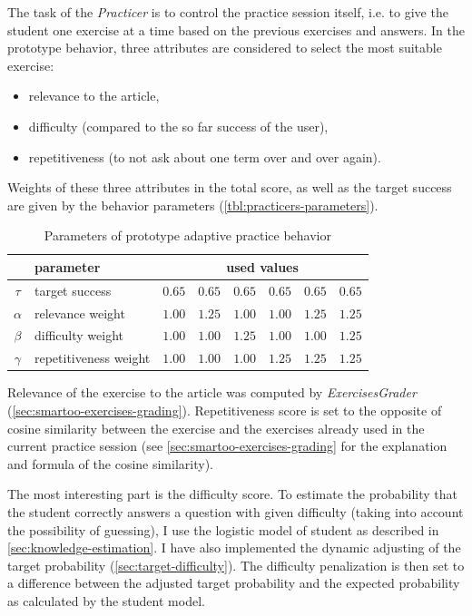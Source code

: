 \documentclass[12pt, twoside]{fithesis2}
\renewcommand{\_}{\leavevmode \kern0.07em\vbox{\hrule width0.4em}}
\newcommand{\squarebullet}{\textcolor{black}{\raisebox{0.15em}{\rule{4pt}{4pt}}}}
\newcommand{\emptysquarebullet}{\textcolor{black}{\raisebox{0.10em}{\tiny$\square$}}}
\newenvironment{myItemize}{
  \begin{itemize}[leftmargin=2em,rightmargin=1em,itemsep=\parskip ,parsep=0em,topsep=0em,partopsep=0em]
  \renewcommand{\labelitemi}{\squarebullet}
  \renewcommand{\labelitemii}{\textbullet}
}{
  \end{itemize}
}
\begin{document}
The task of the \textit{Practicer} is to control the practice session itself, i.e. to give the student one exercise at a time based on the previous exercises and answers.
In the prototype behavior, three attributes are considered to select the most suitable exercise:
\begin{myItemize}
  \item relevance to the article,
  \item difficulty (compared to the so far success of the user),
  \item repetitiveness (to not ask about one term over and over again).
\end{myItemize}
Weights of these three attributes in the total score, as well as the target success
are given by the behavior parameters (\autoref{tbl:practicers-parameters}).
\begin{table}[h]
\begin{center}
\begin{tabular}{| c | l | r | r |  r  |  r |  r | r |}
  \hline
           & parameter & \multicolumn{6}{c|}{used values} \\
  \hline
  $\tau$   & target success        & $0.65$ & $0.65$ & $0.65$ & $0.65$ & $0.65$ & $0.65$\\
  $\alpha$ & relevance weight      & $1.00$ & $1.25$ & $1.00$ & $1.00$ & $1.25$ & $1.25$\\
  $\beta$  & difficulty weight     & $1.00$ & $1.00$ & $1.25$ & $1.00$ & $1.00$ & $1.25$\\
  $\gamma$ & repetitiveness weight & $1.00$ & $1.00$ & $1.00$ & $1.25$ & $1.25$ & $1.25$\\
  \hline
\end{tabular}
\end{center}
\caption{Parameters of prototype adaptive practice behavior}
\label{tbl:practicers-parameters}
\end{table}

Relevance of the exercise to the article was computed by \textit{ExercisesGrader}
(\autoref{sec:smartoo-exercises-grading}).
Repetitiveness score is set to the opposite of cosine similarity between the exercise and the exercises already used in the current practice session
(see \autoref{sec:smartoo-exercises-grading} for the explanation and formula of the cosine similarity).

The most interesting part is the difficulty score.
To estimate the probability that the student correctly answers a question with given difficulty (taking into account the possibility of guessing),
I use the logistic model of student as described in \autoref{sec:knowledge-estimation}.
I have also implemented the dynamic adjusting of the target probability (\autoref{sec:target-difficulty}).
The difficulty penalization is then set to a difference between the adjusted target probability and the expected probability as calculated by the student model.
\end{document}
